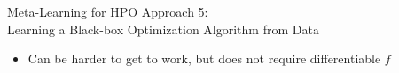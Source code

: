\begin{frame}[c]{Meta-Learning for HPO Approach 5:\\ Learning a Black-box Optimization Algorithm from Data}
\begin{itemize}
\begin{itemize}
\begin{itemize}
            \item Can be harder to get to work, but does not require differentiable $f$
        \end{itemize}
    

    \end{itemize}
\end{itemize}

\end{frame}
